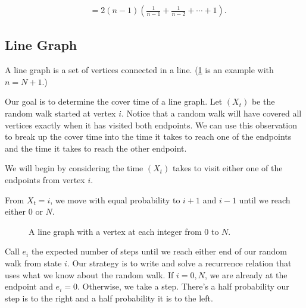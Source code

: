 \documentclass[12pt]{article}
\theoremstyle{definition}
\DeclareMathOperator{\tcov}{t_\textrm{cov}}      %
\begin{document}
\begin{align}
\tcov&= 2(n-1) \left(\frac{1}{n-1}+\frac{1}{n-2}+\cdots+1\right). \nonumber
\end{align}

\subsection{Line Graph}\label{sec:line_graph}
A line graph is a set of vertices connected in a line.
(\cref{fig:line} is an example with $n=N+1$.)

Our goal is to determine the cover time of a line graph.
Let $(X_t)$ be the random walk started at vertex $i$.
Notice that a random walk will have covered all vertices
exactly when it has visited both endpoints.
We can use this observation to break up the cover time into the time it takes
to reach one of the endpoints and the time it takes to reach 
the other endpoint.

We will begin by considering the time $(X_t)$ takes to
visit either one of the endpoints from vertex $i$.

From $X_t=i$, we move with equal probability to $i+1$
and $i-1$ until we reach either $0$ or $N$.

\begin{figure}[ht]
	\centering
	\caption{A   line graph with a vertex at each integer from $0$ to $N$.}\label{fig:line}
\end{figure}

Call $e_i$ the expected number of steps until we reach either
end of our random walk from state $i$.
Our strategy is to write and solve a recurrence relation that
uses what we know about the random walk.
If $i=0,N$, we are already at the endpoint and $e_i=0$.
Otherwise, we take a step.
There's a half probability our step is to the right and
a half probability it is to the left.
\end{document}
